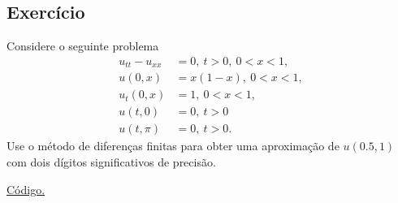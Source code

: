 \subsection*{Exercício}

\begin{exer}
  Considere o seguinte problema
  \begin{align}
    u_{tt} - u_{xx} &= 0,~t>0,~0< x < 1,\\
    u(0,x) &= x(1-x),~0<x<1,\\
    u_t(0,x) &= 1,~0<x<1,\\
    u(t,0) &= 0,~t>0\\
    u(t,\pi) &= 0,~t>0.
  \end{align}
Use o método de diferenças finitas para obter uma aproximação de $u(0.5,1)$ com dois dígitos significativos de precisão.
\end{exer}
\begin{resp}
  \ifisoctave 
  \href{https://github.com/phkonzen/notas/blob/master/src/MatematicaNumerica/cap_edp/dados/exer_edp_onda_1/exer_edp_onda_1.m}{Código.} 
  \fi
  $$
\end{resp}



\emconstrucao